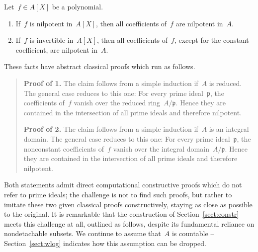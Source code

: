 \documentclass[envcountsect,envcountsame,runningheads]{llncs}
\newcommand{\ppp}{\mathfrak{p}}
\renewcommand{\_}{\mathpunct{.}\,}
\begin{document}
\begin{proposition}\label{prop:test-cases}Let~$f \in A[X]$ be a polynomial.
\begin{enumerate}
\item If~$f$ is nilpotent in~$A[X]$, then all coefficients of~$f$ are nilpotent in~$A$.
\item If~$f$ is invertible in~$A[X]$, then all coefficients of~$f$, except for
the constant coefficient, are
nilpotent in~$A$.
\end{enumerate}
\end{proposition}

These facts have abstract classical proofs which run as follows.

\begin{quote}\scriptsize
  \textbf{Proof of 1.} The claim follows from a simple induction if~$A$ is
  reduced. The general case reduces to this one: For every prime ideal~$\ppp$,
  the coefficients of~$f$ vanish over the reduced ring~$A/\ppp$. Hence they are
  contained in the intersection of all prime ideals and therefore
  nilpotent.\medskip

  \textbf{Proof of 2.} The claim follows from a simple induction if~$A$ is an
  integral domain. The general case reduces to this one: For every prime
  ideal~$\ppp$, the nonconstant coefficients of~$f$ vanish over the integral
  domain~$A/\ppp$. Hence they are contained in the intersection of all prime ideals
  and therefore nilpotent.
\end{quote}

Both statements admit direct computational constructive proofs which do not
refer to prime ideals; the challenge is not to find such proofs, but rather to
imitate these two given classical proofs constructively, staying as close as
possible to the original. It is remarkable that the construction of
Section~\ref{sect:constr} meets this challenge at all, outlined as follows, despite its fundamental
reliance on nondetachable subsets. We continue to assume that~$A$ is countable --
Section~\ref{sect:wlog} indicates how this assumption can be dropped.
\end{document}
